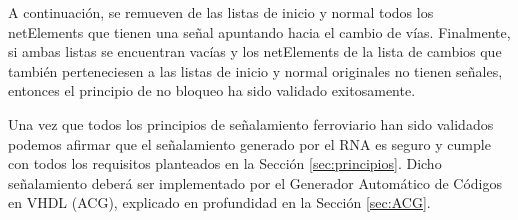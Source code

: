 		A continuación, se remueven de las listas de inicio y normal todos los netElements que tienen una señal apuntando hacia el cambio de vías. Finalmente, si ambas listas se encuentran vacías y los netElements de la lista de cambios que también perteneciesen a las listas de inicio y normal originales no tienen señales, entonces el principio de no bloqueo ha sido validado exitosamente.
		
	Una vez que todos los principios de señalamiento ferroviario han sido validados podemos afirmar que el señalamiento generado por el RNA es seguro y cumple con todos los requisitos planteados en la Sección \ref{sec:principios}. Dicho señalamiento deberá ser implementado por el Generador Automático de Códigos en VHDL (ACG), explicado en profundidad en la Sección \ref{sec:ACG}.
